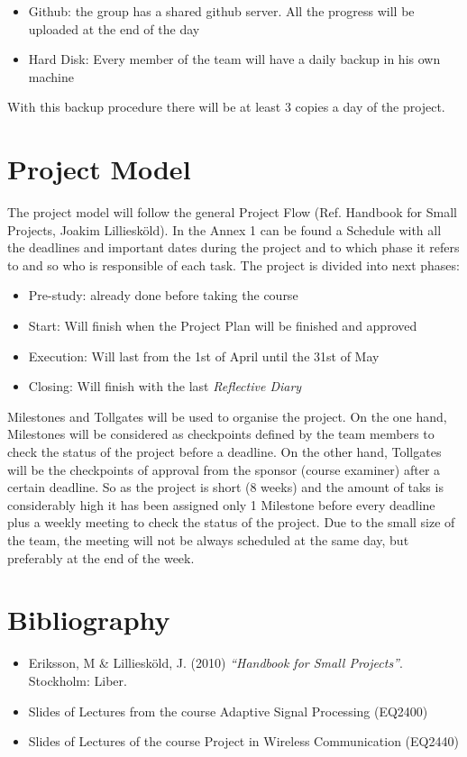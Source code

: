 \documentclass[11pt]{article}
\begin{document}
\begin{itemize}
\item Github: the group has a shared github server. All the progress will be uploaded at the end of the day
\item Hard Disk: Every member of the team will have a daily backup in his own machine
\end{itemize}

With this backup procedure there will be at least 3 copies a day of the project.

\section{Project Model}

The project model will follow the general Project Flow (Ref. Handbook for Small Projects, Joakim Lilliesköld). In the Annex 1 can be found a Schedule with all the deadlines and important dates during the project and to which phase it refers to and so who is responsible of each task. The project is divided into next phases:

\begin{itemize}
\item Pre-study: already done before taking the course
\item Start: Will finish when the Project Plan will be finished and approved
\item Execution: Will last from the 1st of April until the 31st of May
\item Closing: Will finish with the last \textit{Reflective Diary}
\end{itemize}

Milestones and Tollgates will be used to organise the project. On the one hand, Milestones will be considered as checkpoints defined by the team members to check the status of the project before a deadline. On the other hand, Tollgates will be the checkpoints of approval from the sponsor (course examiner) after a certain deadline. So as the project is short (8 weeks) and the amount of taks is considerably high it has been assigned only 1 Milestone before every deadline plus a weekly meeting to check the status of the project. Due to the small size of the team, the meeting will not be always scheduled at the same day, but preferably at the end of the week.

\section{Bibliography}


\begin{itemize}
\item Eriksson, M \& Lilliesköld, J. (2010) \textit{``Handbook for Small Projects''}. Stockholm: Liber.
\item Slides of Lectures from the course Adaptive Signal Processing (EQ2400)
\item Slides of Lectures of the course Project in Wireless Communication (EQ2440)
\end{itemize}




\end{document}
